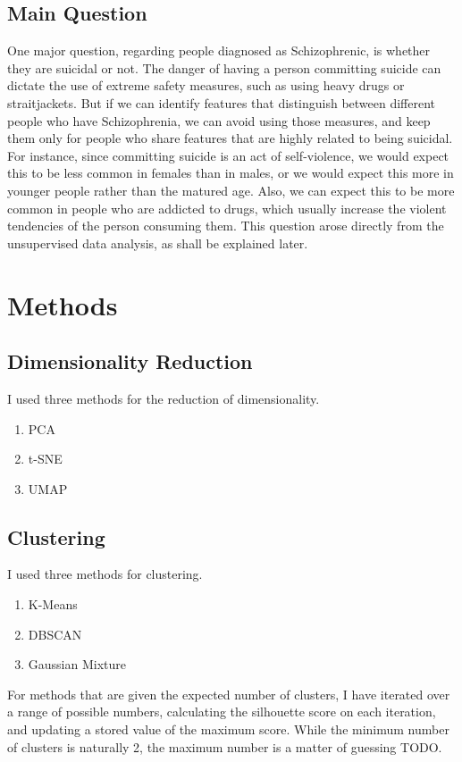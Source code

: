 \documentclass{article}
\begin{document}
\subsection{Main Question}
One major question, regarding people diagnosed as Schizophrenic, is whether they are suicidal or not. The danger of having a person committing suicide can dictate the use of extreme safety measures, such as using heavy drugs or straitjackets. But if we can identify features that distinguish between different people who have Schizophrenia, we can avoid using those measures, and keep them only for people who share features that are highly related to being suicidal. 
For instance, since committing suicide is an act of self-violence, we would expect this to be less common in females than in males, or we would expect this more in younger people rather than the matured age. Also, we can expect this to be more common in people who are addicted to drugs, which usually increase the violent tendencies of the person consuming them.
This question arose directly from the unsupervised data analysis, as shall be explained later.
\section{Methods}
\subsection{Dimensionality Reduction}
I used three methods for the reduction of dimensionality.
\begin{enumerate}
    \item PCA
    \item t-SNE
    \item UMAP
\end{enumerate}

\subsection{Clustering}
I used three methods for clustering.
\begin{enumerate}
    \item K-Means
    \item DBSCAN
    \item Gaussian Mixture
\end{enumerate}

For methods that are given the expected number of clusters, I have iterated over a range of possible numbers, calculating the silhouette score on each iteration, and updating a stored value of the maximum score. While the minimum number of clusters is naturally 2, the maximum number is a matter of guessing TODO.
\end{document}
